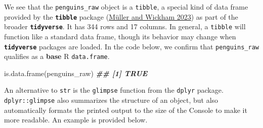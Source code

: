 \documentclass[
]{book}
\newenvironment{Shaded}{\begin{snugshade}}{\end{snugshade}}
\newcommand{\DocumentationTok}[1]{\textcolor[rgb]{0.56,0.35,0.01}{\textbf{\textit{#1}}}}
\newcommand{\FunctionTok}[1]{\textcolor[rgb]{0.00,0.00,0.00}{#1}}
\newcommand{\NormalTok}[1]{#1}
\theoremstyle{definition}
\theoremstyle{definition}
\theoremstyle{definition}
\theoremstyle{definition}
\theoremstyle{remark}
\begin{document}
We see that the \texttt{penguins\_raw} object is a \texttt{tibble}, a special kind of data frame provided by the \textbf{\texttt{tibble}} package (\protect\hyperlink{ref-R-tibble}{Müller and Wickham 2023}) as part of the broader \textbf{\texttt{tidyverse}}. It has 344 rows and 17 columns. In general, a \texttt{tibble} will function like a standard data frame, though its behavior may change when \textbf{\texttt{tidyverse}} packages are loaded. In the code below, we confirm that \texttt{penguins\_raw} qualifies as a \textbf{base} R \texttt{data.frame}.

\begin{Shaded}
\begin{Highlighting}[]
\FunctionTok{is.data.frame}\NormalTok{(penguins\_raw)}
\DocumentationTok{\#\# [1] TRUE}
\end{Highlighting}
\end{Shaded}

An alternative to \texttt{str} is the \texttt{glimpse} function from the \texttt{dplyr} package. \texttt{dplyr::glimpse} also summarizes the structure of an object, but also automatically formats the printed output to the size of the Console to make it more readable. An example is provided below.
\end{document}
